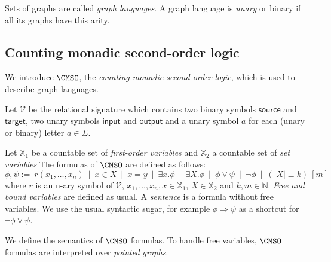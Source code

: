 \begin{definition}
Sets of graphs are called \emph{graph languages}.  A graph language is \emph{unary} or binary if all its graphs have this arity.
\end{definition}


\subsection{Counting monadic second-order logic}

We introduce $\CMSO$, the \emph{counting monadic second-order logic}, which is used to describe graph languages. 

\begin{definition}
Let $\mathcal{V}$ be the relational signature  which contains two binary symbols $\mathsf{source}$ and $\mathsf{target}$,   two unary symbols $\mathsf{input}$ and $\mathsf{output}$ and a unary symbol $a$ for each (unary or binary) letter $a\in \Sigma$. %
\smallskip

Let $\mathbb{X}_1$ be a countable set of \emph{first-order variables} and $\mathbb{X}_2$  a countable set of \emph{set variables}
 The formulas of $\CMSO$  are defined as follows:
$$ \phi, \psi:= \  r(x_1,\dots, x_n) \ \mid \ x\in X \ \mid\ x=y \ \mid \ \exists x. \phi \ \mid \ \exists X. \phi \ \mid\ \phi\vee \psi\ \mid \ \neg \phi\ \mid \ \left(|X|\equiv k\right)\ [m]$$ 
 where $r$ is an n-ary symbol of $\mathcal{V}$,  $x_1,\dots,x_n, x\in \mathbb{X}_1$,  $X\in\mathbb{X}_2$ and $k,m\in\mathbb{N}$. \emph{Free and bound variables} are defined as usual. A \emph{sentence} is a formula without free variables. We use the usual syntactic sugar, for example $\phi\Rightarrow\psi$ as a shortcut for $\neg \phi\vee \psi$.
\end{definition}


We define the semantics of $\CMSO$ formulas. To handle free variables, $\CMSO$ formulas are interpreted over \emph{pointed graphs}.

